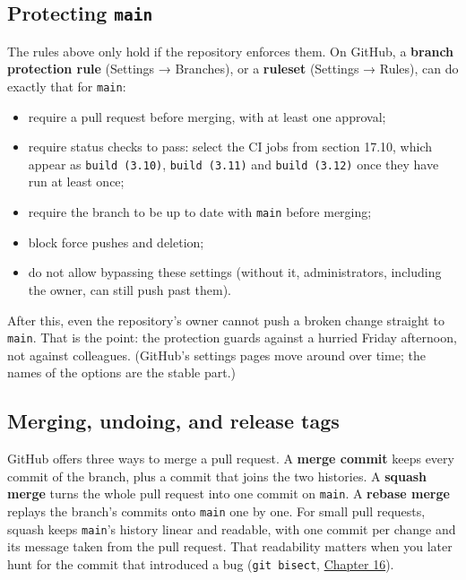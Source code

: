 \subsection*{\texorpdfstring{Protecting \texttt{main}}{Protecting main}}\label{17-build-process:protecting-main}

The rules above only hold if the repository enforces them. On GitHub, a \textbf{branch protection rule} (Settings → Branches), or a \textbf{ruleset} (Settings → Rules), can do exactly that for \texttt{main}:

\begin{itemize}
\tightlist
\item
  require a pull request before merging, with at least one approval;
\item
  require status checks to pass: select the CI jobs from section 17.10, which appear as \texttt{build\ (3.10)}, \texttt{build\ (3.11)} and \texttt{build\ (3.12)} once they have run at least once;
\item
  require the branch to be up to date with \texttt{main} before merging;
\item
  block force pushes and deletion;
\item
  do not allow bypassing these settings (without it, administrators, including the owner, can still push past them).
\end{itemize}

\noindent{}After this, even the repository's owner cannot push a broken change straight to \texttt{main}. That is the point: the protection guards against a hurried Friday afternoon, not against colleagues. (GitHub's settings pages move around over time; the names of the options are the stable part.)

\subsection*{Merging, undoing, and release tags}\label{17-build-process:merging-undoing-and-release-tags}

GitHub offers three ways to merge a pull request. A \textbf{merge commit} keeps every commit of the branch, plus a commit that joins the two histories. A \textbf{squash merge} turns the whole pull request into one commit on \texttt{main}. A \textbf{rebase merge} replays the branch's commits onto \texttt{main} one by one. For small pull requests, squash keeps \texttt{main}'s history linear and readable, with one commit per change and its message taken from the pull request. That readability matters when you later hunt for the commit that introduced a bug (\texttt{git\ bisect}, \hyperref[ch:16-logging-error-handling]{Chapter 16}).

